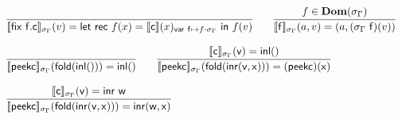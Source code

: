 \begin{definition}[Interpretation]
\begin{displaymath}
\begin{array}{l}
\infer{\interp{\fix~\dslcom{f}.\dslcom{c}}_{\sigma_{\Gamma}}(v)=\rec{f}{x}{\interp{\dslcom{c}}(x)_{\mathsf{var~f} \mapsto f \cdot \sigma_{\Gamma}}}{f}(v)}{} \qquad
\infer{\interp{\mathsf{f}}_{\sigma_{\Gamma}}(a,v)=(a,(\sigma_{\Gamma}~\mathsf{f})(v))}{f \in \mathbf{Dom}(\sigma_{\Gamma})}
\\\\
\infer{\interpsig{peek c}{fold (inl ())}{inl ()}}{} \qquad
\infer{\interpsig{peek c}{fold (inr (v,x))}{(\dslcom{peek c})(x)}}{\interpsig{c}{v}{inl ()}}
\\\\
\infer{\interpsig{peek c}{fold (inr (v,x))}{inr (w,x)}}{\interpsig{c}{v}{inr~w}}
    \end{array}
  \end{displaymath}
\end{definition}
